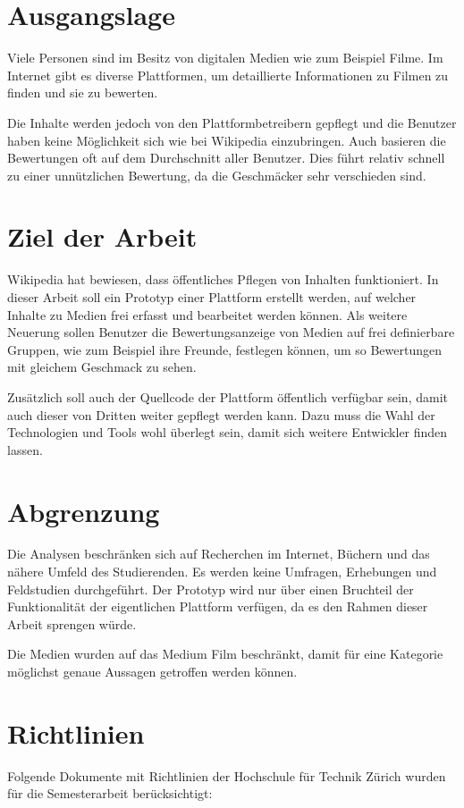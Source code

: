 \section{Ausgangslage}
Viele Personen sind im Besitz von digitalen Medien wie zum Beispiel Filme.
Im Internet gibt es diverse Plattformen, um detaillierte Informationen zu 
Filmen zu finden und sie zu bewerten. 

Die Inhalte werden jedoch von den Plattformbetreibern gepflegt und die 
Benutzer haben keine Möglichkeit sich wie bei Wikipedia einzubringen. Auch 
basieren die Bewertungen oft auf dem Durchschnitt aller Benutzer. Dies
führt relativ schnell zu einer unnützlichen Bewertung, da die Geschmäcker
sehr verschieden sind.

\section{Ziel der Arbeit}
Wikipedia hat bewiesen, dass öffentliches Pflegen von Inhalten 
funktioniert. In dieser Arbeit soll ein Prototyp einer Plattform erstellt
werden, auf welcher Inhalte zu Medien frei erfasst und bearbeitet werden können.
Als weitere Neuerung sollen Benutzer die Bewertungsanzeige von Medien auf
frei definierbare Gruppen, wie zum Beispiel ihre Freunde, festlegen 
können, um so Bewertungen mit gleichem Geschmack zu sehen.

Zusätzlich soll auch der Quellcode der Plattform öffentlich verfügbar sein, 
damit auch dieser von Dritten weiter gepflegt werden kann. Dazu muss die 
Wahl der Technologien und Tools wohl überlegt sein, damit sich weitere 
Entwickler finden lassen.

\section{Abgrenzung}
Die Analysen beschränken sich auf Recherchen im Internet, Büchern und das 
nähere Umfeld des Studierenden. Es werden keine Umfragen, Erhebungen und 
Feldstudien durchgeführt. Der Prototyp wird nur über einen Bruchteil der 
Funktionalität der eigentlichen Plattform verfügen, da es den Rahmen
dieser Arbeit sprengen würde.

Die Medien wurden auf das Medium Film beschränkt, damit für eine 
Kategorie möglichst genaue Aussagen getroffen werden können.

\section{Richtlinien}
Folgende Dokumente mit Richtlinien der Hochschule für Technik Zürich 
wurden für die Semesterarbeit berücksichtigt:

